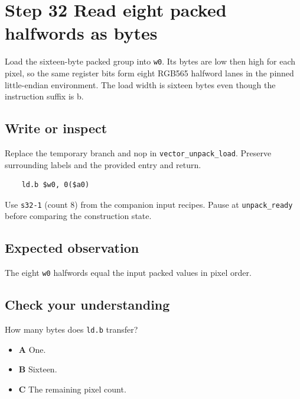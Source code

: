 \section{Step 32 Read eight packed halfwords as bytes}\label{rgb-s32}

Load the sixteen-byte packed group into \texttt{w0}. Its bytes are low then high for each pixel, so the same register bits form eight RGB565 halfword lanes in the pinned little-endian environment. The load width is sixteen bytes even though the instruction suffix is b.

\subsection{Write or inspect}
Replace the temporary branch and nop in \texttt{vector\_unpack\_load}. Preserve surrounding labels and the provided entry and return.

\begin{verbatim}
    ld.b $w0, 0($a0)
\end{verbatim}
Use \texttt{s32-1} (count 8) from the companion input recipes. Pause at \texttt{unpack\_ready} before comparing the construction state.

\subsection{Expected observation}
The eight \texttt{w0} halfwords equal the input packed values in pixel order.

\subsection{Check your understanding}
How many bytes does \texttt{ld.b} transfer?

\begin{itemize}
  \item \textbf{A} One.
  \item \textbf{B} Sixteen.
  \item \textbf{C} The remaining pixel count.
\end{itemize}
